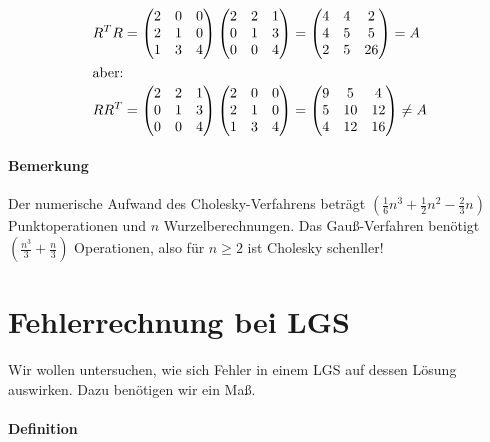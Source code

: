 \documentclass[a4paper,ngerman]{scrbook}
\begin{document}
\begin{align*}
R^TR &=
\begin{pmatrix}
  2 & 0 & 0\\
  2 & 1 & 0\\
  1 & 3 & 4
\end{pmatrix}
\begin{pmatrix}
  2 & 2 & 1\\
  0 & 1 & 3\\
  0 & 0 & 4
\end{pmatrix} =
\begin{pmatrix}
  4 & 4 & 2\\
  4 & 5 & 5\\
  2 & 5 & 26
\end{pmatrix} = A\\
\intertext{aber:}
RR^T &= 
\begin{pmatrix}
  2 & 2 & 1\\
  0 & 1 & 3\\
  0 & 0 & 4
\end{pmatrix}
\begin{pmatrix}
  2 & 0 & 0\\
  2 & 1 & 0\\
  1 & 3 & 4
\end{pmatrix} =
\begin{pmatrix}
  9 & 5 & 4\\
  5 & 10 & 12\\
  4 & 12 & 16
\end{pmatrix} \neq A
\end{align*}

\paragraph{Bemerkung}

Der numerische Aufwand des Cholesky-Verfahrens beträgt $\left(\frac{1}{6} n^3 + \frac{1}{2}n^2 - \frac{2}{3} n\right)$ Punktoperationen und $n$ Wurzelberechnungen.
Das Gauß-Verfahren benötigt $\left(\frac{n^3}{3} + \frac{n}{3}\right)$ Operationen, also für $n \geq 2$ ist Cholesky schenller!

\section{Fehlerrechnung bei LGS}
\label{sec:fehlerlgs}

Wir wollen untersuchen, wie sich Fehler in einem LGS auf dessen Lösung auswirken. Dazu benötigen wir ein Maß.

\paragraph{Definition}
\end{document}
